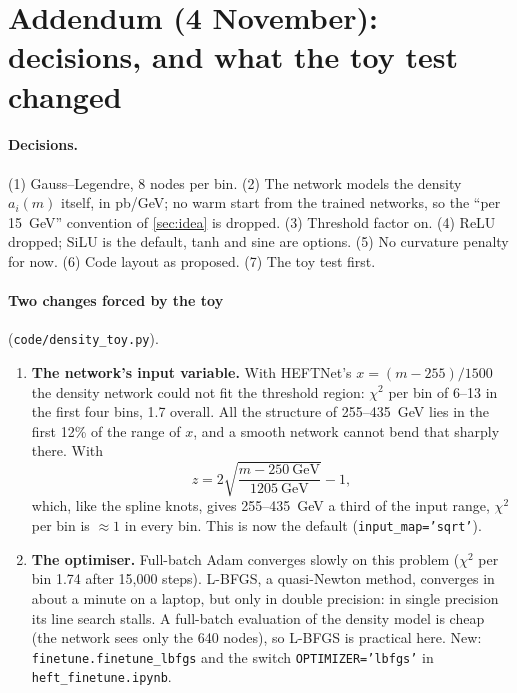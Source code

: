 \documentclass[11pt]{article}
\newcommand{\file}[1]{\nolinkurl{#1}}
\newcommand{\code}[1]{\texttt{#1}}
\begin{document}
\section{Addendum (4 November): decisions, and what the toy test changed}
\label{sec:addendum}

\paragraph{Decisions.} (1) Gauss--Legendre, 8 nodes per bin. (2) The network models the density
$a_i(m)$ itself, in pb/GeV; no warm start from the trained networks, so the ``per 15~GeV''
convention of \cref{sec:idea} is dropped. (3) Threshold factor on. (4) ReLU dropped; SiLU is
the default, tanh and sine are options. (5) No curvature penalty for now. (6) Code layout as
proposed. (7) The toy test first.

\paragraph{Two changes forced by the toy} (\file{code/density_toy.py}).
\begin{enumerate}
  \item \textbf{The network's input variable.} With HEFTNet's $x = (m-255)/1500$ the density
    network could not fit the threshold region: $\chi^2$ per bin of 6--13 in the first four bins,
    1.7 overall. All the structure of 255--435~GeV lies in the first 12\% of the range of $x$, and
    a smooth network cannot bend that sharply there. With
    \begin{equation}
      z = 2\sqrt{\frac{m - 250~\text{GeV}}{1205~\text{GeV}}} - 1 ,
    \end{equation}
    which, like the spline knots, gives 255--435~GeV a third of the input range, $\chi^2$ per bin
    is $\approx 1$ in every bin. This is now the default (\code{input\_map='sqrt'}).
  \item \textbf{The optimiser.} Full-batch Adam converges slowly on this problem ($\chi^2$ per bin
    1.74 after 15,000 steps). L-BFGS, a quasi-Newton method, converges in about a minute on a
    laptop, but only in double precision: in single precision its line search stalls. A full-batch
    evaluation of the density model is cheap (the network sees only the 640 nodes), so L-BFGS is
    practical here. New: \code{finetune.finetune\_lbfgs} and the switch \code{OPTIMIZER='lbfgs'} in
    \file{heft_finetune.ipynb}.
\end{enumerate}
\end{document}
